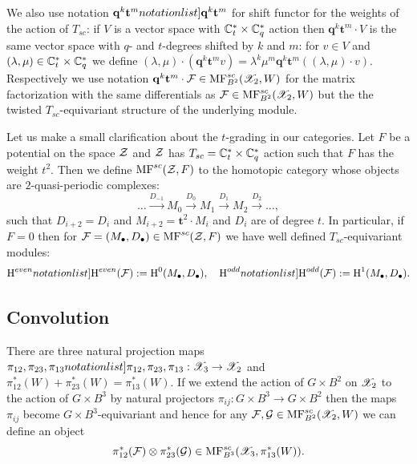 We also use notation $\SymbolPrint{\mathbf{q}^k\mathbf{t}^m}$ for shift functor for the weights of the action of $T_{sc}$:  if $V$ is a vector space with $\mathbb{C}^*_t\times\mathbb{C}^*_q$ action then $\mathbf{q}^k\mathbf{t}^m\cdot V$
is the same vector space with $q$- and $t$-degrees shifted by $k$ and $m$: for $v\in V$ and $(\lambda,\mu)\in\mathbb{C}^*_t\times\mathbb{C}^*_q$ we define $(\lambda,\mu)\cdot(\mathbf{q}^k\mathbf{t}^m v) = \lambda^k\mu^m \mathbf{q}^k\mathbf{t}^m((\lambda,\mu)\cdot v)$.
Respectively we use notation $\mathbf{q}^k\mathbf{t}^m\cdot \mathcal{F}\in \mathrm{MF}^{sc}_{B^2}(\mathscr{X}_2,W)$ for the matrix factorization with the same differentials as $\mathcal{F}\in \mathrm{MF}^{sc}_{B^2}(\mathscr{X}_2,W)$ but the the twisted $T_{sc}$-equivariant structure of the underlying module.


Let us make a small clarification about the  $t$-grading in our categories. Let $F$ be 
a potential on the space $\mathcal{Z}$ and $\mathcal{Z}$ has $T_{sc}=\mathbb{C}^*_t\times \mathbb{C}^*_q$ action such that $F$ has  the weight $t^2$. Then we define $\mathrm{MF}^{sc}(\mathcal{Z},F)$ to the 
homotopic category whose objects are  $2$-quasi-periodic complexes:
$$\dots \xrightarrow{D_{-1}}M_{0}\xrightarrow{D_0}M_1\xrightarrow{D_1}M_2\xrightarrow{D_2}\dots,$$
such that $D_{i+2}=D_i$ and $M_{i+2}=\mathbf{t}^2 \cdot M_i$ and $D_i$ are of 
degree $t$. In particular, if $F=0$ then for 
$\mathcal{F}=(M_\bullet,D_\bullet)\in \mathrm{MF}^{sc}(\mathcal{Z},F)$ we have well defined $T_{sc}$-equivariant modules:
$$ \SymbolPrint{\textup{H}^{even}}(\calF):=\textup{H}^0(M_\bullet,D_\bullet),\quad 
\SymbolPrint{\textup{H}^{odd}}(\calF):=\textup{H}^1(M_\bullet,D_\bullet).$$





 \subsection{Convolution}
There are three natural projection maps $\SymbolPrint{\pi_{12},\pi_{23},\pi_{13}}:\calX_3\to\calX_2$ and $\pi_{12}^*(W)+\pi_{23}^*(W)=\pi_{13}^*(W)$. If we extend the action of $G\times B^2$ on $\mathscr{X}_2$ to the action
of $G\times B^3$ by natural projectors $\pi_{ij}:G\times B^3\to G\times B^2$ then
the maps $\pi_{ij}$ become $G\times B^3$-equivariant and hence
 for any $\mathcal{F},\mathcal{G}\in \mathrm{MF}^{sc}_{B^2}(\mathscr{X}_2,W)$ we can define an object
 $$\pi_{12}^*(\mathcal{F})\otimes\pi_{23}^*(\mathcal{G})\in \mathrm{MF}^{sc}_{B^3}(\mathscr{X}_3,\pi_{13}^*(W)).$$

